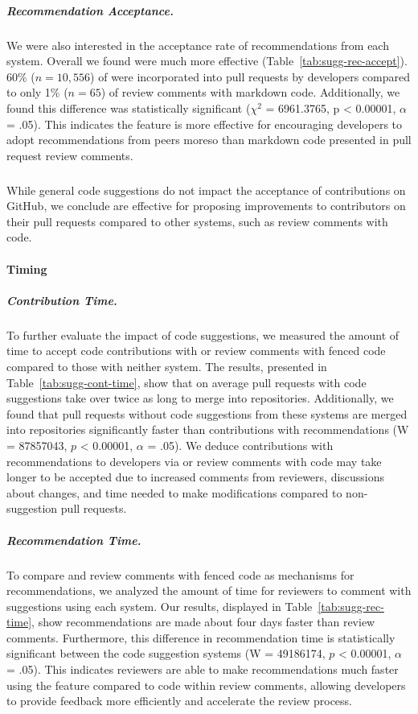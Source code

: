  \subparagraph{Recommendation Acceptance.} We were also interested in the acceptance rate of recommendations from each system. Overall we found \suggs were much more effective (Table~\ref{tab:sugg-rec-accept}). 60\% ($n = 10,556$) of \sugg were incorporated into pull requests by developers compared to only 1\% ($n =  65$) of review comments with markdown code. Additionally, we found this difference was statistically significant ($\chi^2$ = 6961.3765, p < 0.00001, $\alpha$ = .05). This indicates the \sugg feature is more effective for encouraging developers to adopt recommendations from peers moreso than markdown code presented in pull request review comments.
 
 \subparagraph{} While general code suggestions do not impact the acceptance of contributions on GitHub, we conclude \sugg are effective for proposing improvements to contributors on their pull requests compared to other systems, such as review comments with code.


\paragraph*{Timing} 

\subparagraph{Contribution Time.} 

To further evaluate the impact of code suggestions, we measured the amount of time to accept code contributions with \sugg or review comments with fenced code compared to those with neither system. The results, presented in Table~\ref{tab:sugg-cont-time}, show that on average pull requests with code suggestions take over twice as long to merge into repositories. Additionally, we found that pull requests without code suggestions from these systems are merged into repositories significantly faster than contributions with recommendations (W = 87857043, $p$ < 0.00001, $\alpha$ = .05). We deduce contributions with recommendations to developers via \sugg or review comments with code may take longer to be accepted due to increased comments from reviewers, discussions about changes, and time needed to make modifications compared to non-suggestion pull requests.

\subparagraph{Recommendation Time.}

To compare \suggs and review comments with fenced code as mechanisms for recommendations, we analyzed the amount of time for reviewers to comment with suggestions using each system. Our results, displayed in Table~\ref{tab:sugg-rec-time}, show \sugg recommendations are made about four days faster than review comments. Furthermore, this difference in recommendation time is statistically significant between the code suggestion systems (W = 49186174, $p$ < 0.00001, $\alpha$ = .05). This indicates reviewers are able to make recommendations much faster using the \sugg feature compared to code within review comments, allowing developers to provide feedback more efficiently and accelerate the review process.

